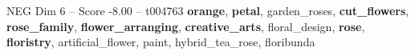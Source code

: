 \begin{textsample}{NEG Dim 6 – Score -8.00 – t004763}  \label{ex:f6_neg_023}
\textbf{orange}, \textbf{petal}, garden\_roses, \textbf{cut\_flowers}, \textbf{rose\_family}, \textbf{flower\_arranging}, \textbf{creative\_arts}, floral\_design, \textbf{rose}, \textbf{floristry}, artificial\_flower, paint, hybrid\_tea\_rose, floribunda

\end{textsample}
